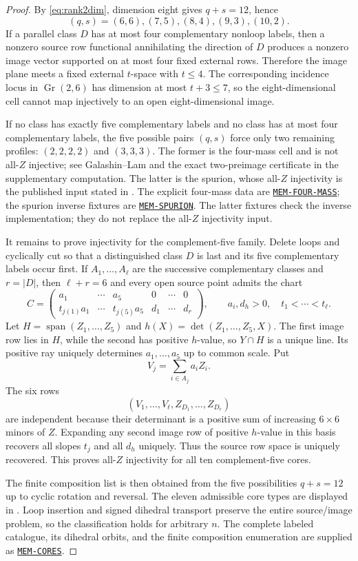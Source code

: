 \documentclass[11pt]{article}
\newcommand{\Gr}{\operatorname{Gr}}
\newcommand{\1}{\mathbf 1}
\newcommand{\Span}{\operatorname{span}}
\newcommand{\cert}[1]{\hyperref[cert:#1]{\texttt{#1}}}
\begin{document}
\begin{proof}
By \eqref{eq:rank2dim}, dimension eight gives $q+s=12$, hence
\[
(q,s)=(6,6),(7,5),(8,4),(9,3),(10,2).
\]
If a parallel class $D$ has at most four complementary nonloop labels,
then a nonzero source row functional annihilating the direction of $D$
produces a nonzero image vector supported on at most four fixed external
rows.  Therefore the image plane meets a fixed external $t$-space with
$t\le4$.  The corresponding incidence locus in $\Gr(2,6)$ has dimension
at most $t+3\le7$, so the eight-dimensional cell cannot map injectively to
an open eight-dimensional image.

If no class has exactly five complementary labels and no class has at most
four complementary labels, the five possible pairs $(q,s)$ force only two
remaining profiles: $(2,2,2,2)$ and $(3,3,3)$.  The former is the
four-mass cell and is not all-$Z$ injective; see Galashin--Lam
\cite{GalashinLam} and the exact two-preimage certificate in the
supplementary computation.  The latter is the spurion, whose all-$Z$
injectivity is the published input stated in
\cite[Section 5.1]{ClusterResults}.  The explicit four-mass data are
\cert{MEM-FOUR-MASS}; the spurion inverse fixtures are
\cert{MEM-SPURION}.  The latter fixtures check the inverse implementation;
they do not replace the all-$Z$ injectivity input.

It remains to prove injectivity for the complement-five family.  Delete
loops and cyclically cut so that a distinguished class $D$ is last and
its five complementary labels occur first.  If
$A_1,\dots,A_\ell$ are the successive complementary classes and
$r=|D|$, then $\ell+r=6$ and every open source point admits the chart
\[
C=\begin{pmatrix}
 a_1&\cdots&a_5&0&\cdots&0\\
 t_{j(1)}a_1&\cdots&t_{j(5)}a_5&d_1&\cdots&d_r
\end{pmatrix},
\qquad a_i,d_h>0,\quad t_1<\cdots<t_\ell.
\]
Let $H=\Span(Z_1,\dots,Z_5)$ and
$h(X)=\det(Z_1,\dots,Z_5,X)$.  The first image row lies in $H$, while the
second has positive $h$-value, so $Y\cap H$ is a unique line.  Its positive
ray uniquely determines $a_1,\dots,a_5$ up to common scale.  Put
\[
V_j=\sum_{i\in A_j}a_iZ_i.
\]
The six rows
\[
(V_1,\dots,V_\ell,Z_{D_1},\dots,Z_{D_r})
\]
are independent because their determinant is a positive sum of increasing
$6\times6$ minors of $Z$.  Expanding any second image row of positive
$h$-value in this basis recovers all slopes $t_j$ and all $d_h$ uniquely.
Thus the source row space is uniquely recovered.  This proves all-$Z$
injectivity for all ten complement-five cores.

The finite composition list is then obtained from the five possibilities
$q+s=12$ up to cyclic rotation and reversal.  The eleven admissible core
types are displayed in .  Loop insertion and
signed dihedral transport preserve the entire source/image problem, so the
classification holds for arbitrary $n$.
The complete labeled catalogue, its dihedral orbits, and the finite
composition enumeration are supplied as \cert{MEM-CORES}.
\end{proof}
\end{document}
